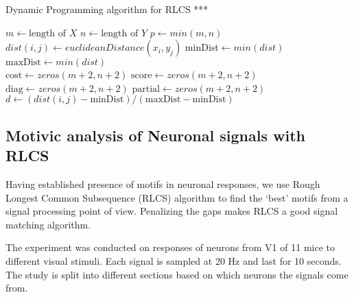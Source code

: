 \documentclass[MTech]{iitmdiss}
\begin{document}
\begin{algorithm}
\caption{Dynamic Programming algorithm for RLCS ***}\label{euclid}
\begin{algorithmic}[1]
  \State $m \gets \text{length of }\textit{X}$
  \State $n \gets \text{length of }\textit{Y}$
  \State $p \gets min(m, n)$
      \State $dist(i, j) \gets euclideanDistance(x_i, y_j)$
    \EndFor
  \EndFor
  \State $\text{minDist} \gets min(dist)$ 
  \State $\text{maxDist} \gets min(dist)$ \\

  \State $\text{cost} \gets zeros(m+2, n+2)$ 
  \State $\text{score} \gets zeros(m+2, n+2)$ 
  \State $\text{diag} \gets zeros(m+2, n+2)$ 
  \State $\text{partial} \gets zeros(m+2, n+2)$ \\

      \State $d \gets (dist(i, j) - \text{minDist})/(\text{maxDist} - \text{minDist})$ 
    \EndFor
  \EndFor
  \EndFunction
\end{algorithmic}
\end{algorithm}
\subsection{Motivic analysis of Neuronal signals with RLCS} %
\label{sub:motivic_analysis_of_neuronal_signals_with_rlcs}
Having established presence of motifs in neuronal responses, we use Rough Longest Common Subsequence (RLCS) algorithm to find the `best' motifs from a signal processing point of view. Penalizing the gaps makes RLCS a good signal matching algorithm.

The experiment was conducted on responses of neurons from V1 of 11 mice to different visual stimuli. Each signal is sampled at 20 Hz and last for 10 seconds. The study is split into different sections based on which neurons the signals come from.
\end{document}
